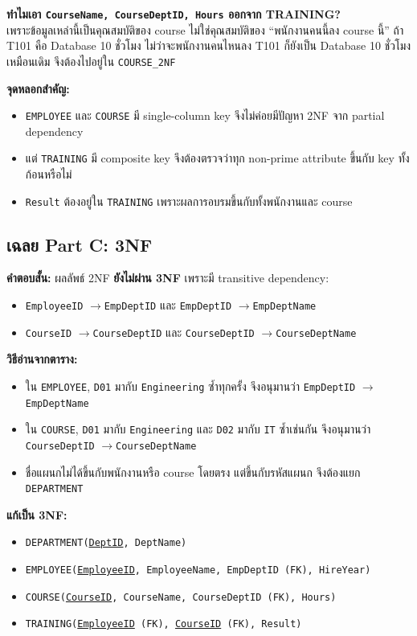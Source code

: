 \documentclass[a4paper,12pt]{article}
\newcommand{\pk}[1]{\uline{#1}}
\newcommand{\fd}{\(\rightarrow\)}
\newcommand{\schema}[1]{\texttt{#1}}
\begin{document}
\textbf{ทำไมเอา \schema{CourseName, CourseDeptID, Hours} ออกจาก TRAINING?}\\
เพราะข้อมูลเหล่านี้เป็นคุณสมบัติของ course ไม่ใช่คุณสมบัติของ ``พนักงานคนนี้ลง course นี้'' ถ้า T101 คือ Database 10 ชั่วโมง ไม่ว่าจะพนักงานคนไหนลง T101 ก็ยังเป็น Database 10 ชั่วโมงเหมือนเดิม จึงต้องไปอยู่ใน \schema{COURSE\_2NF}

\textbf{จุดหลอกสำคัญ:}
\begin{itemize}
    \item \schema{EMPLOYEE} และ \schema{COURSE} มี single-column key จึงไม่ค่อยมีปัญหา 2NF จาก partial dependency
    \item แต่ \schema{TRAINING} มี composite key จึงต้องตรวจว่าทุก non-prime attribute ขึ้นกับ key ทั้งก้อนหรือไม่
    \item \schema{Result} ต้องอยู่ใน \schema{TRAINING} เพราะผลการอบรมขึ้นกับทั้งพนักงานและ course
\end{itemize}

\newpage
\subsection*{เฉลย Part C: 3NF}
\textbf{คำตอบสั้น:} ผลลัพธ์ 2NF \textbf{ยังไม่ผ่าน 3NF} เพราะมี transitive dependency:

\begin{itemize}
    \item \schema{EmployeeID} \fd \schema{EmpDeptID} และ \schema{EmpDeptID} \fd \schema{EmpDeptName}
    \item \schema{CourseID} \fd \schema{CourseDeptID} และ \schema{CourseDeptID} \fd \schema{CourseDeptName}
\end{itemize}

\textbf{วิธีอ่านจากตาราง:}
\begin{itemize}
    \item ใน \schema{EMPLOYEE}, \schema{D01} มากับ \schema{Engineering} ซ้ำทุกครั้ง จึงอนุมานว่า \schema{EmpDeptID} \fd \schema{EmpDeptName}
    \item ใน \schema{COURSE}, \schema{D01} มากับ \schema{Engineering} และ \schema{D02} มากับ \schema{IT} ซ้ำเช่นกัน จึงอนุมานว่า \schema{CourseDeptID} \fd \schema{CourseDeptName}
    \item ชื่อแผนกไม่ได้ขึ้นกับพนักงานหรือ course โดยตรง แต่ขึ้นกับรหัสแผนก จึงต้องแยก \schema{DEPARTMENT}
\end{itemize}

\textbf{แก้เป็น 3NF:}
\begin{itemize}
    \item \schema{DEPARTMENT(\pk{DeptID}, DeptName)}
    \item \schema{EMPLOYEE(\pk{EmployeeID}, EmployeeName, EmpDeptID (FK), HireYear)}
    \item \schema{COURSE(\pk{CourseID}, CourseName, CourseDeptID (FK), Hours)}
    \item \schema{TRAINING(\pk{EmployeeID} (FK), \pk{CourseID} (FK), Result)}
\end{itemize}
\end{document}
